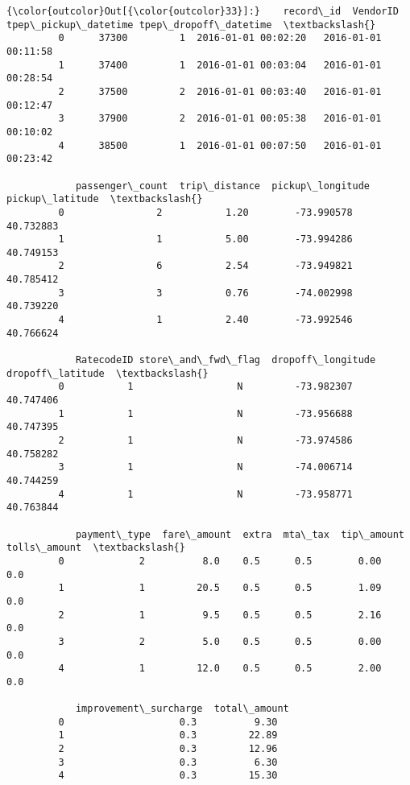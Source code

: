 \documentclass[11pt]{article}
\begin{document}
\begin{Verbatim}[commandchars=\\\{\}]
{\color{outcolor}Out[{\color{outcolor}33}]:}    record\_id  VendorID tpep\_pickup\_datetime tpep\_dropoff\_datetime  \textbackslash{}
         0      37300         1  2016-01-01 00:02:20   2016-01-01 00:11:58   
         1      37400         1  2016-01-01 00:03:04   2016-01-01 00:28:54   
         2      37500         2  2016-01-01 00:03:40   2016-01-01 00:12:47   
         3      37900         2  2016-01-01 00:05:38   2016-01-01 00:10:02   
         4      38500         1  2016-01-01 00:07:50   2016-01-01 00:23:42   
         
            passenger\_count  trip\_distance  pickup\_longitude  pickup\_latitude  \textbackslash{}
         0                2           1.20        -73.990578        40.732883   
         1                1           5.00        -73.994286        40.749153   
         2                6           2.54        -73.949821        40.785412   
         3                3           0.76        -74.002998        40.739220   
         4                1           2.40        -73.992546        40.766624   
         
            RatecodeID store\_and\_fwd\_flag  dropoff\_longitude  dropoff\_latitude  \textbackslash{}
         0           1                  N         -73.982307         40.747406   
         1           1                  N         -73.956688         40.747395   
         2           1                  N         -73.974586         40.758282   
         3           1                  N         -74.006714         40.744259   
         4           1                  N         -73.958771         40.763844   
         
            payment\_type  fare\_amount  extra  mta\_tax  tip\_amount  tolls\_amount  \textbackslash{}
         0             2          8.0    0.5      0.5        0.00           0.0   
         1             1         20.5    0.5      0.5        1.09           0.0   
         2             1          9.5    0.5      0.5        2.16           0.0   
         3             2          5.0    0.5      0.5        0.00           0.0   
         4             1         12.0    0.5      0.5        2.00           0.0   
         
            improvement\_surcharge  total\_amount  
         0                    0.3          9.30  
         1                    0.3         22.89  
         2                    0.3         12.96  
         3                    0.3          6.30  
         4                    0.3         15.30  
\end{Verbatim}
            
\end{document}
